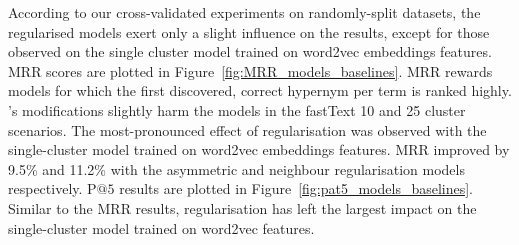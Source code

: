 According to our cross-validated experiments on randomly-split datasets, the regularised models exert only a slight influence on the results, except for those observed on the single cluster model trained on word2vec embeddings features.  MRR scores are plotted in Figure~\ref{fig:MRR_models_baselines}.  MRR rewards models for which the first discovered, correct hypernym per term is ranked highly.  \citeauthor{ustalov2017negative}'s modifications slightly harm the models in the fastText 10 and 25 cluster scenarios.  The most-pronounced effect of regularisation was observed with the single-cluster model trained on word2vec embeddings features.  MRR improved by 9.5\% and 11.2\%  with the asymmetric and neighbour regularisation models respectively.  P$@5$ results are plotted in Figure~\ref{fig:pat5_models_baselines}.  Similar to the MRR results, regularisation has left the largest impact on the single-cluster model trained on word2vec features.
